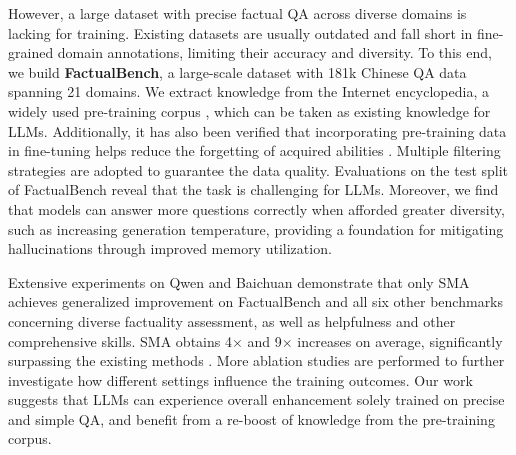 However, a large dataset with precise factual QA across diverse domains is lacking for training. Existing datasets \citep{yang2015wikiqa, joshi2017triviaqa, yang2018hotpotqa, kwiatkowski2019natural} are usually outdated and fall short in fine-grained domain annotations, limiting their accuracy and diversity. To this end, we build \textbf{FactualBench}, a large-scale dataset with 181k Chinese QA data spanning 21 domains. We extract knowledge from the Internet encyclopedia, a widely used pre-training corpus \citep{liu2024datasets, ando2024wikisqe}, which can be taken as existing knowledge for LLMs. Additionally, it has also been verified that incorporating pre-training data in fine-tuning helps reduce the forgetting of acquired abilities \citep{ouyang2022training}. Multiple filtering strategies are adopted to guarantee the data quality. Evaluations on the test split of FactualBench reveal that the task is challenging for LLMs. Moreover, we find that models can answer more questions correctly when afforded greater diversity, such as increasing generation temperature, providing a foundation for mitigating hallucinations through improved memory utilization.

Extensive experiments on Qwen and Baichuan demonstrate that only SMA achieves generalized improvement on FactualBench and all six other benchmarks concerning diverse factuality assessment, as well as helpfulness and other comprehensive skills. SMA obtains 4$\times$ and 9$\times$ increases on average, significantly surpassing the existing methods \citep{factscore, flame, self-eval-skt}. More ablation studies are performed to further investigate how different settings influence the training outcomes. Our work suggests that LLMs can experience overall enhancement solely trained on precise and simple QA, and benefit from a re-boost of knowledge from the pre-training corpus.  
